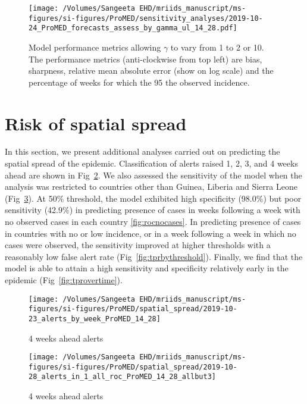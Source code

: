\documentclass[9pt,twoside,lineno]{pnas-new}
\begin{document}
\begin{figure}
    \centering
    \texttt{[image: /Volumes/Sangeeta EHD/mriids\_manuscript/ms-figures/si-figures/ProMED/sensitivity\_analyses/2019-10-24\_ProMED\_forecasts\_assess\_by\_gamma\_ul\_14\_28.pdf]} 
  \caption{Model performance metrics allowing $\gamma$ to vary from
    1 to 2 or 10. The performance metrics (anti-clockwise from top left) are
    bias, sharpness, relative mean absolute error (show on log scale) and
    the percentage of weeks for which the 95%
    the observed incidence.}\label{fig:perfbygamma}
\end{figure}\FloatBarrier

\section{Risk of spatial spread}\label{sec:spatial-spread}

In this section, we present additional analyses carried out on
predicting the spatial spread of the epidemic. Classification of
alerts raised 1, 2, 3, and 4 weeks ahead are shown in
Fig~\ref{fig:alerts4weekahead}. We also assessed the sensitivity
of the model when the analysis was restricted to countries other than
Guinea, Liberia and Sierra Leone (Fig~\ref{fig:alertsallbut3}). At
50\% threshold, the
model exhibited high specificity (98.0\%) but poor sensitivity (42.9\%) in predicting 
presence of cases in weeks following a week with no observed cases in each
country \ref{fig:rocnocases}. In predicting presence of cases in
countries with no or low incidence, or in a
week following a week in which no cases were observed, the sensitivity
improved at higher thresholds with a reasonably low false alert rate
(Fig~\ref{fig:tprbythreshold}). Finally, we find that the model is
able to attain a high sensitivity and specificity relatively early in 
the epidemic (Fig~\ref{fig:tprovertime}).
 
\begin{figure}
\centering
\texttt{[image: /Volumes/Sangeeta EHD/mriids\_manuscript/ms-figures/si-figures/ProMED/spatial\_spread/2019-10-23\_alerts\_by\_week\_ProMED\_14\_28]}
\caption{4 weeks ahead alerts}
\label{fig:alerts4weekahead}
\end{figure}\FloatBarrier


\begin{figure}
\centering
\texttt{[image: /Volumes/Sangeeta EHD/mriids\_manuscript/ms-figures/si-figures/ProMED/spatial\_spread/2019-10-28\_alerts\_in\_1\_all\_roc\_ProMED\_14\_28\_allbut3]}
\caption{4 weeks ahead alerts}
\label{fig:alertsallbut3}
\end{figure}\FloatBarrier
\end{document}
